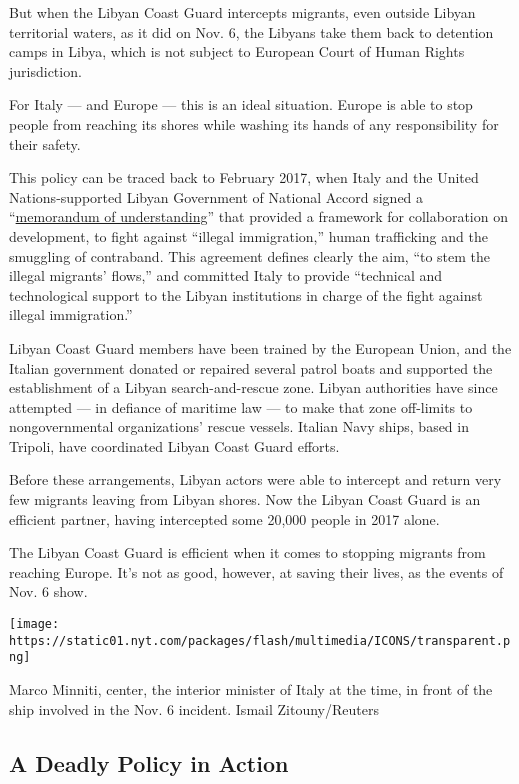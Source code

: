 But when the Libyan Coast Guard intercepts migrants, even outside Libyan
territorial waters, as it did on Nov. 6, the Libyans take them back to
detention camps in Libya, which is not subject to European Court of
Human Rights jurisdiction.

For Italy --- and Europe --- this is an ideal situation. Europe is able
to stop people from reaching its shores while washing its hands of any
responsibility for their safety.

This policy can be traced back to February 2017, when Italy and the
United Nations-supported Libyan Government of National Accord signed a
``\href{https://www.repubblica.it/esteri/2017/02/02/news/migranti_accordo_italia-libia_ecco_cosa_contiene_in_memorandum-157464439/?refresh_ce}{memorandum
of understanding}'' that provided a framework for collaboration on
development, to fight against ``illegal immigration,'' human trafficking
and the smuggling of contraband. This agreement defines clearly the aim,
``to stem the illegal migrants' flows,'' and committed Italy to provide
``technical and technological support to the Libyan institutions in
charge of the fight against illegal immigration.''

Libyan Coast Guard members have been trained by the European Union, and
the Italian government donated or repaired several patrol boats and
supported the establishment of a Libyan search-and-rescue zone. Libyan
authorities have since attempted --- in defiance of maritime law --- to
make that zone off-limits to nongovernmental organizations' rescue
vessels. Italian Navy ships, based in Tripoli, have coordinated Libyan
Coast Guard efforts.

Before these arrangements, Libyan actors were able to intercept and
return very few migrants leaving from Libyan shores. Now the Libyan
Coast Guard is an efficient partner, having intercepted some 20,000
people in 2017 alone.

The Libyan Coast Guard is efficient when it comes to stopping migrants
from reaching Europe. It's not as good, however, at saving their lives,
as the events of Nov. 6 show.

\texttt{[image: https://static01.nyt.com/packages/flash/multimedia/ICONS/transparent.png]}

Marco Minniti, center, the interior minister of Italy at the time, in
front of the ship involved in the Nov. 6 incident. Ismail
Zitouny/Reuters

\hypertarget{a-deadly-policy-in-action}{%
\subsection{A Deadly Policy in Action}\label{a-deadly-policy-in-action}}

